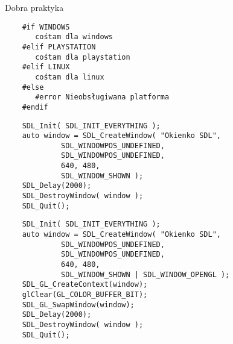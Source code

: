 \documentclass{beamer}
\begin{document}
\begin{frame}[fragile]
    Dobra praktyka
    \begin{verbatim}
    #if WINDOWS
       cośtam dla windows
    #elif PLAYSTATION
       cośtam dla playstation
    #elif LINUX
       cośtam dla linux
    #else
       #error Nieobsługiwana platforma
    #endif
    \end{verbatim}
    \EB
\end{frame}


\begin{frame}[fragile]
    \begin{verbatim}
    SDL_Init( SDL_INIT_EVERYTHING ); 
    auto window = SDL_CreateWindow( "Okienko SDL", 
             SDL_WINDOWPOS_UNDEFINED, 
             SDL_WINDOWPOS_UNDEFINED, 
             640, 480, 
             SDL_WINDOW_SHOWN ); 
    SDL_Delay(2000);
    SDL_DestroyWindow( window );
    SDL_Quit();
     \end{verbatim}
     \EB
\end{frame}

\begin{frame}[fragile]
    \begin{verbatim}
    SDL_Init( SDL_INIT_EVERYTHING ); 
    auto window = SDL_CreateWindow( "Okienko SDL", 
             SDL_WINDOWPOS_UNDEFINED, 
             SDL_WINDOWPOS_UNDEFINED, 
             640, 480, 
             SDL_WINDOW_SHOWN | SDL_WINDOW_OPENGL ); 
    SDL_GL_CreateContext(window);
    glClear(GL_COLOR_BUFFER_BIT);
    SDL_GL_SwapWindow(window);
    SDL_Delay(2000);
    SDL_DestroyWindow( window );
    SDL_Quit(); 
     \end{verbatim}
     \EB
\end{frame}
\end{document}
